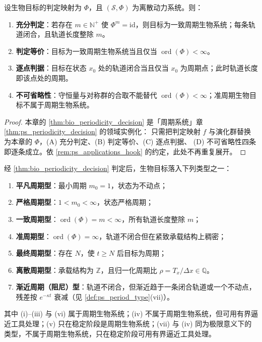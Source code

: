 \begin{theorem}[生物周期性判定定理]\label{thm:bio_periodicity_decision}
设生物目标的判定映射为 $\Phi$，且 $(\mathcal S,\Phi)$ 为离散动力系统。则：
\begin{enumerate}[label=(\Alph*)]
    \item \textbf{充分判定}：若存在 $m\in\mathbb N^+$ 使 $\Phi^m=\mathrm{id}$，则目标为一致周期生物系统；每条轨道闭合，且轨道长度整除 $m$。
    \item \textbf{判定等价}：目标为一致周期生物系统当且仅当 $\operatorname{ord}(\Phi)<\infty$。
    \item \textbf{逐点判据}：目标在状态 $x_0$ 处的轨道闭合当且仅当 $x_0$ 为周期点；此时轨道长度即该点处的周期。
    \item \textbf{不可省略性}：守恒量与对称群的合取不能替代 $\operatorname{ord}(\Phi)<\infty$；准周期生物目标不属于周期生物系统。
\end{enumerate}
\end{theorem}

\begin{proof}
本章的 \cref{thm:bio_periodicity_decision} 是「周期系统」章 \cref{thm:ps_periodicity_decision} 的领域实例化：
只需把判定映射 $f$ 与演化群替换为本章的 $\Phi$，(A) 充分判定、(B) 判定等价、(C) 逐点判据、
(D) 不可省略性四条即逐条成立。依 \cref{rem:ps_applications_hook} 的约定，此处不再重复展开。
\end{proof}

\begin{corollary}[生物周期类型]\label{cor:bio_period_type}
经 \cref{thm:bio_periodicity_decision} 判定后，生物目标落入下列类型之一：
\begin{enumerate}[label=(\roman*)]
    \item \textbf{平凡周期型}：最小周期 $m_0=1$，状态为不动点；
    \item \textbf{严格周期型}：$1<m_0<\infty$，状态严格周期；
    \item \textbf{一致周期型}：$\operatorname{ord}(\Phi)=m<\infty$，所有轨道长度整除 $m$；
    \item \textbf{准周期型}：$\operatorname{ord}(\Phi)=\infty$，轨道不闭合但在紧致承载结构上稠密；
    \item \textbf{最终周期型}：存在 $N$，使 $t\ge N$ 后目标为周期；
    \item \textbf{离散周期型}：承载结构为 $\mathbb Z$，且归一化周期比 $\rho=T_x/\Delta x\in\mathbb Q$。
    \item \textbf{渐近周期（阻尼）型}：轨道不闭合，但渐近趋于一条闭合轨道或一个不动点，残差按 $e^{-\kappa t}$ 衰减（见 \cref{def:ps_period_type}(vii)）。
\end{enumerate}
其中 (i)--(iii) 与 (vi) 属于周期生物系统；(iv) 不属于周期生物系统，但可用有界逼近工具处理；(v) 只在稳定阶段是周期生物系统；(vii) 与 (iv) 同为极限意义下的类型，不属于周期生物系统，只在稳定阶段可用有界逼近工具处理。
\end{corollary}

